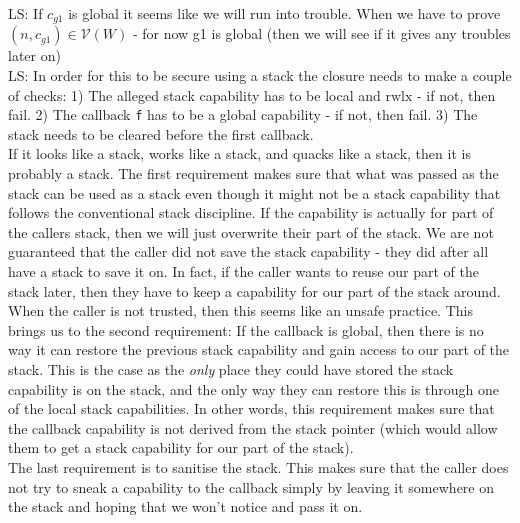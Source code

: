 \documentclass[a4paper]{article}
\newcommand\lau[1]{{\color{purple} \sf \footnotesize {LS: #1}}\\}
\newcommand{\asmType}{\plaindom{AsmType}}
\newcommand{\plaindom}[1]{\mathrm{#1}}
\newcommand{\intr}[2]{\mathcal{#1}}
\newcommand{\valueintr}[1]{\intr{V}{#1}}
\newcommand{\stdvr}{\valueintr{\asmType}}
\newcommand{\npair}[2][n]{\left(#1,#2 \right)}
\newcommand{\plainperm}[1]{\mathrm{#1}}
\newcommand{\rwlx}{\plainperm{rwlx}}
\begin{document}
\lau{If $c_{g1}$ is global it seems like we will run into trouble. When we have to prove $\npair{c_{g1}} \in \stdvr(W)$ - for now g1 is global (then we will see if it gives any troubles later on)}



\lau{In order for this to be secure using a stack the closure needs to make a couple of checks: 1) The alleged stack capability has to be local and $\rwlx$ - if not, then fail. 2) The callback \texttt{f} has to be a global capability - if not, then fail. 3) The stack needs to be cleared before the first callback. \\If it looks like a stack, works like a stack, and quacks like a stack, then it is probably a stack. The first requirement makes sure that what was passed as the stack can be used as a stack even though it might not be a stack capability that follows the conventional stack discipline. If the capability is actually for part of the callers stack, then we will just overwrite their part of the stack. We are not guaranteed that the caller did not save the stack capability - they did after all have a stack to save it on. In fact, if the caller wants to reuse our part of the stack later, then they have to keep a capability for our part of the stack around. When the caller is not trusted, then this seems like an unsafe practice. This brings us to the second requirement: If the callback is global, then there is no way it can restore the previous stack capability and gain access to our part of the stack. This is the case as the \emph{only} place they could have stored the stack capability is on the stack, and the only way they can restore this is through one of the local stack capabilities. In other words, this requirement makes sure that the callback capability is not derived from the stack pointer (which would allow them to get a stack capability for our part of the stack).\\ The last requirement is to sanitise the stack. This makes sure that the caller does not try to sneak a capability to the callback simply by leaving it somewhere on the stack and hoping that we won't notice and pass it on. }
\end{document}
